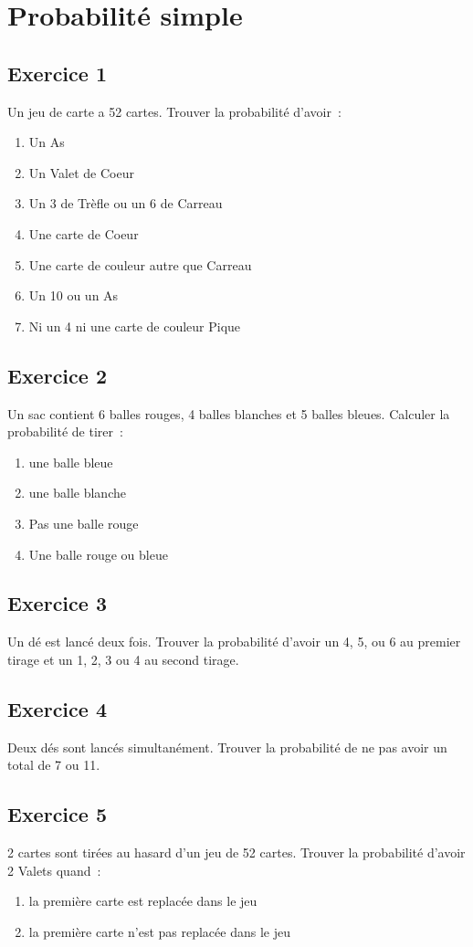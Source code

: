 \documentclass[]{book}
\theoremstyle{definition}
\begin{document}
\section*{Probabilit\'e simple}
\subsection*{Exercice 1}
Un jeu de carte a 52 cartes. Trouver la probabilit\'e d'avoir\ :
\begin{enumerate}
\item Un As
\item Un Valet de Coeur
\item Un 3 de Tr\`efle ou un 6 de Carreau
\item Une carte de Coeur
\item Une carte de couleur autre que Carreau
\item Un 10 ou un As
\item Ni un 4 ni une carte de couleur Pique
\end{enumerate}

\subsection*{Exercice 2}
Un sac contient 6 balles rouges, 4 balles blanches et 5 balles bleues. Calculer la probabilit\'e de tirer\ :
\begin{enumerate}
\item une balle bleue
\item une balle blanche
\item Pas une balle rouge
\item Une balle rouge ou bleue
\end{enumerate}

\subsection*{Exercice 3}
Un d\'e est lanc\'e deux fois. Trouver la probabilit\'e d'avoir un 4, 5, ou 6 au premier tirage et un 1, 2, 3 ou 4 au second tirage.

\subsection*{Exercice 4}
Deux d\'es sont lanc\'es simultan\'ement. Trouver la probabilit\'e de ne pas avoir un total de 7 ou 11.

\subsection*{Exercice 5}
2 cartes sont tir\'ees au hasard d'un jeu de 52 cartes. Trouver la probabilit\'e d'avoir 2 Valets quand\ :
\begin{enumerate}
\item la premi\`ere carte est replac\'ee dans le jeu
\item la premi\`ere carte n'est pas replac\'ee dans le jeu
\end{enumerate}
\end{document}
